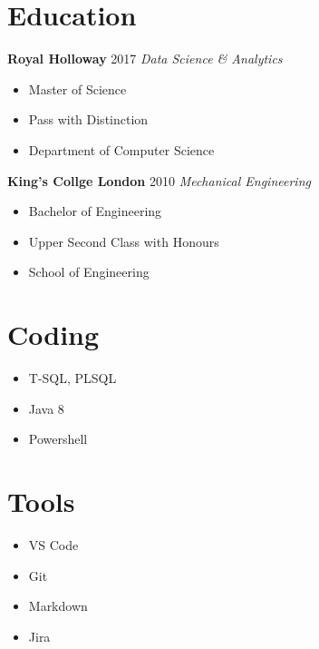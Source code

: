 \documentclass[letterpaper,11pt]{article}
\begin{document}
\begin{minipage}[t]{0.3\linewidth}
	\section{Education}
	\textbf{Royal Holloway} \hfill 2017
	\newline
	\textit{Data Science \& Analytics}
	\begin{itemize}[leftmargin=*, itemsep=0.1em]
		\item	Master of Science
		\item	Pass with Distinction
		\item 	Department of Computer Science
	\end{itemize}
	\vspace{0.15cm}
	\textbf{King's Collge London} \hfill 2010
	\newline
	\textit{Mechanical Engineering}
	\begin{itemize}[leftmargin=*, itemsep=0.1em]
		\item Bachelor of Engineering
		\item Upper Second Class with Honours
		\item School of Engineering
	\end{itemize}
\end{minipage}
\hspace{0.2cm}
\begin{minipage}[t]{0.15\linewidth}
	\section{Coding}
	\begin{itemize}[leftmargin=*]
		\item T-SQL, PLSQL		
		\item Java 8		
		\item Powershell		
	\end{itemize}
	\section{Tools}
	\begin{itemize}[leftmargin=*]
		\item VS Code
		\item Git		
		\item Markdown
		\item Jira
	\end{itemize}
\end{minipage}
\end{document}
